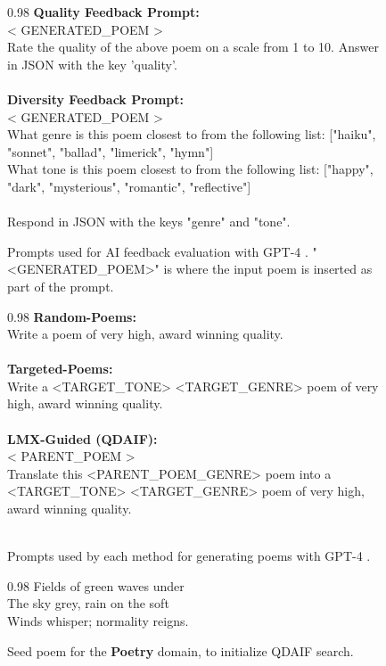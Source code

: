 \begin{figure}[H]
\centering
\begin{boxedminipage}{0.98\textwidth}
\textbf{Quality Feedback Prompt:}\\
\textless{} GENERATED\_POEM \textgreater{}\\
Rate the quality of the above poem on a scale from 1 to 10. Answer in JSON with the key 'quality'.\\
\\
\textbf{Diversity Feedback Prompt:}\\
\textless{} GENERATED\_POEM \textgreater{}\\
What genre is this poem closest to from the following list: ["haiku", "sonnet", "ballad", "limerick", "hymn"]\\
What tone is this poem closest to from the following list: ["happy", "dark", "mysterious", "romantic", "reflective"]\\
\\
Respond in JSON with the keys "genre" and "tone".
\end{boxedminipage}
\caption{Prompts used for AI feedback evaluation with GPT-4 \citep{openai2023gpt4}. "<GENERATED\_POEM>" is where the input poem is inserted as part of the prompt.}
\label{app:fig:gpt4_feedback}
\end{figure}

\begin{figure}[H]
\centering
\begin{boxedminipage}{0.98\textwidth}
\textbf{Random-Poems:}\\
Write a poem of very high, award winning quality.\\
\\
\textbf{Targeted-Poems:}\\
Write a \textless{}TARGET\_TONE\textgreater{} \textless{}TARGET\_GENRE\textgreater{} poem of very high, award winning quality.\\
\\
\textbf{LMX-Guided (QDAIF):}\\
\textless{} PARENT\_POEM \textgreater{}\\
Translate this \textless{}PARENT\_POEM\_GENRE\textgreater{} poem 
 into a \textless{}TARGET\_TONE\textgreater{} \textless{}TARGET\_GENRE\textgreater{} poem of very high, award winning quality.\\
\\
\end{boxedminipage}
\caption{Prompts used by each method for generating poems with GPT-4 \citep{openai2023gpt4}.}
\label{app:fig:gpt4_baseline_prompts}
\end{figure}

\begin{figure}[H]
\centering
\begin{boxedminipage}{0.98\textwidth}
Fields of green waves under\\
The sky grey, rain on the soft\\
Winds whisper; normality reigns.
\end{boxedminipage}
\caption{Seed poem for the \textbf{Poetry} domain, to initialize QDAIF search.}
\label{app:fig:gpt4_seed}
\end{figure}

\newpage

